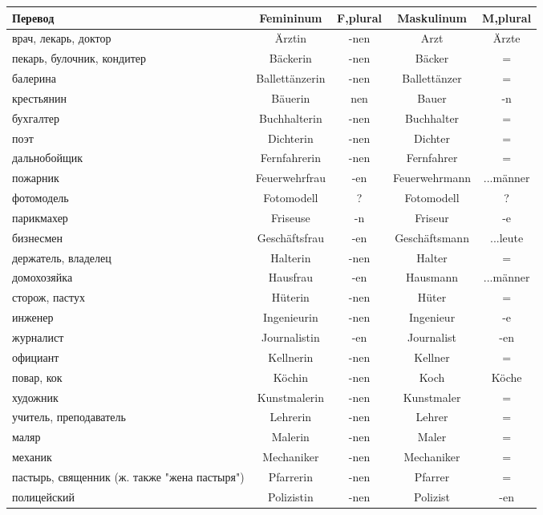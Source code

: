 

\begin{longtable}{|p{4cm}|c|c|c|c|}
\hline
Перевод & Femininum & F,plural & Maskulinum & M,plural \\
\hline\endhead
\hline\endfoot
 врач, лекарь, доктор & \"Arztin & -nen & Arzt & \"Arzte \\
 пекарь, булочник, кондитер & B\"ackerin & -nen & B\"acker & = \\
 балерина & Ballett\"anzerin & -nen & Ballett\"anzer & = \\
 крестьянин & B\"auerin & nen & Bauer & -n \\
 бухгалтер & Buchhalterin & -nen & Buchhalter & = \\
 поэт & Dichterin & -nen & Dichter & = \\
 дальнобойщик & Fernfahrerin & -nen & Fernfahrer & = \\
 пожарник & Feuerwehrfrau & -en & Feuerwehrmann & ...m\"anner \\
 фотомодель & Fotomodell & ? & Fotomodell & ? \\
 парикмахер & Friseuse & -n & Friseur & -e \\
 бизнесмен & Gesch\"aftsfrau & -en & Gesch\"aftsmann & ...leute \\
 держатель, владелец & Halterin & -nen & Halter & = \\
 домохозяйка & Hausfrau & -en & Hausmann & ...m\"anner \\
 сторож, пастух & H\"uterin & -nen & H\"uter & = \\
 инженер & Ingenieurin & -nen & Ingenieur & -e \\
 журналист & Journalistin & -en & Journalist & -en \\
 официант & Kellnerin & -nen & Kellner & = \\
 повар, кок & K\"ochin & -nen & Koch & K\"oche \\
 художник & Kunstmalerin & -nen & Kunstmaler & = \\
 учитель, преподаватель & Lehrerin & -nen & Lehrer & = \\
 маляр & Malerin & -nen & Maler & = \\
 механик & Mechaniker & -nen & Mechaniker & = \\
 пастырь, священник (ж. также "жена пастыря") & Pfarrerin & -nen & Pfarrer & = \\
 полицейский & Polizistin & -nen & Polizist & -en \\

\end{longtable}
